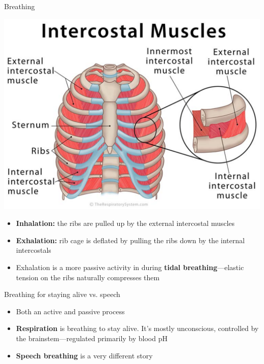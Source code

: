 \documentclass[professionalfonts]{beamer}
\begin{document}
\begin{frame}{Breathing}
    \begin{multicols}{2}
        \includegraphics[width = \linewidth]{figs/IntercostalMuscles.png}
        \columnbreak
        \begin{itemize}
            \item \textbf{Inhalation:} the ribs are pulled up by the external intercostal muscles
            \item \textbf{Exhalation:} rib cage is deflated by pulling the ribs down by the internal intercostals
            \item Exhalation is a more passive activity in during \textbf{tidal breathing}—elastic tension on the ribs naturally compresses them
        \end{itemize}
    \end{multicols}
\end{frame}

\begin{frame}{Breathing for staying alive vs. speech}
    \begin{itemize}
        \item Both an active and passive process
        \item \textbf{Respiration} is breathing to stay alive. It’s mostly unconscious, controlled by the brainstem—regulated primarily by blood pH
        \item \textbf{Speech breathing} is a very different story 
    \end{itemize}
\end{frame}
\end{document}
